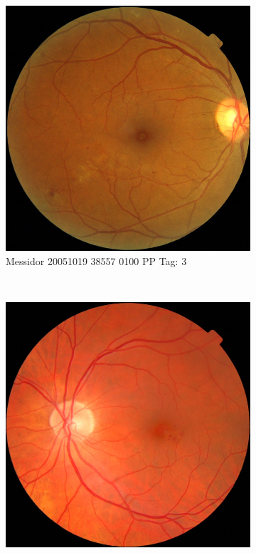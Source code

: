 \begin{figure}[ht!]
	\centering
	\begin{subfigure}[b]{0.4\textwidth}
		\centering
		\includegraphics[width=\textwidth]{Figures/chapter_stability/20051019_38557_0100_PP/20051019_38557_0100_PP.jpeg}
		\caption{Messidor 20051019 38557 0100 PP Tag: 3}				
	\end{subfigure}	 ~
	\begin{subfigure}[b]{0.4\textwidth}
		\centering
		\includegraphics[width=\textwidth]{Figures/chapter_stability/20051020_43906_0100_PP/20051020_43906_0100_PP.jpeg}

\end{subfigure}
\end{figure}
